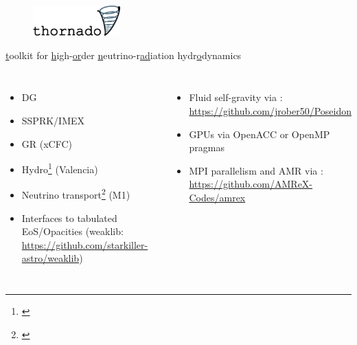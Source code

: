 \documentclass{beamer}
\begin{document}
\begin{frame}

  \begin{figure}[ht]
    \centering
    \includegraphics[width=0.3\textwidth]{fig.thornado_logo.png}
  \end{figure}

  \begin{center}

    \ul{t}oolkit for
    \ul{h}igh-\ul{or}der
    \ul{n}eutrino-r\ul{ad}iation hydr\ul{o}dynamics\\[1em]

    \begin{columns}[c]


        \begin{itemize}
          \item
            DG
          \item
            SSPRK/IMEX
          \item
            GR (xCFC)
          \item
            Hydro\footnote{\citet{ebd2019,dem2020,pbe2021}}
            (Valencia)
          \item
            Neutrino transport\footnote{\citet{lec2021}} (M1)
          \item
            Interfaces to tabulated EoS/Opacities
            (weaklib: \url{https://github.com/starkiller-astro/weaklib})
        \end{itemize}


        \begin{itemize}
          \item
            Fluid self-gravity via \poseidon:
            \url{https://github.com/jrober50/Poseidon}
          \item
            GPUs via OpenACC or OpenMP pragmas
          \item
            MPI parallelism and AMR via \amrex:
            \url{https://github.com/AMReX-Codes/amrex}
        \end{itemize}

    \end{columns}

  \end{center}

\end{frame}
\end{document}
